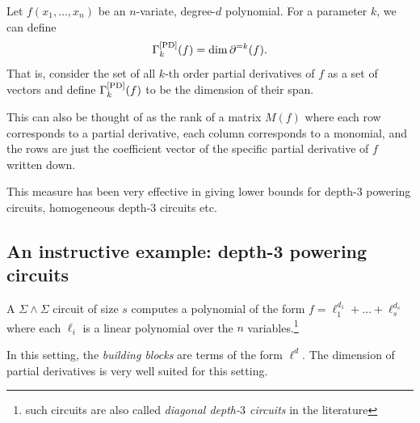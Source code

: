 Let $f(x_1,\ldots, x_n)$ be an $n$-variate, degree-$d$ polynomial. For a parameter $k$, we can define 
\[
\Gamma^{\mathrm{[PD]}}_k(f) = \dim \partial^{=k}(f).
\]
That is, consider the set of all $k$-th order partial derivatives of $f$ as a set of vectors and define $\Gamma^{\mathrm{[PD]}}_k(f)$ to be the dimension of their span. 

This can also be thought of as the rank of a matrix $M(f)$ where each row corresponds to a partial derivative, each column corresponds to a monomial, and the rows are just the coefficient vector of the specific partial derivative of $f$ written down. 


This measure has been very effective in giving lower bounds for depth-$3$ powering circuits, homogeneous depth-$3$ circuits etc. 

\subsection{An instructive example: depth-3 powering circuits}

A $\Sigma\!\wedge\!\Sigma$ circuit of size $s$ computes a polynomial of the form $f = \ell_1^{d_1} + \dots + \ell_s^{d_s}$ where each $\ell_i$ is a linear polynomial over the $n$ variables.\footnote{such circuits are also called \emph{diagonal depth-$3$ circuits} in the literature}

In this setting, the \emph{building blocks} are terms of the form $\ell^d$. 
The dimension of partial derivatives is very well suited for this setting.

